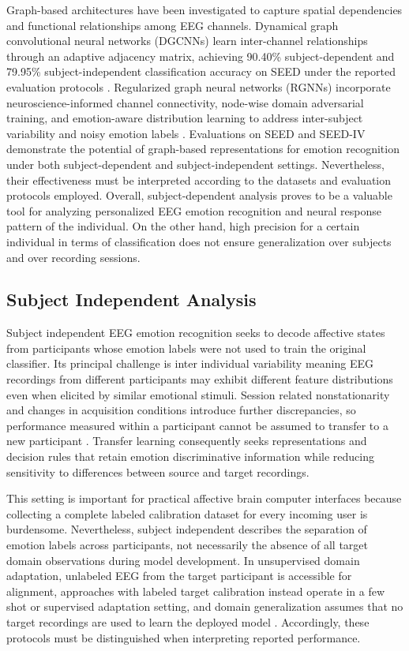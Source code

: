 \documentclass[ASNA,twocolumn]{USG}
\begin{document}
Graph-based architectures have been investigated to capture spatial dependencies and functional relationships among EEG channels. Dynamical graph convolutional neural networks (DGCNNs) learn inter-channel relationships through an adaptive adjacency matrix, achieving 90.40\% subject-dependent and 79.95\% subject-independent classification accuracy on SEED under the reported evaluation protocols \cite{song2018eeg}. Regularized graph neural networks (RGNNs) incorporate neuroscience-informed channel connectivity, node-wise domain adversarial training, and emotion-aware distribution learning to address inter-subject variability and noisy emotion labels \cite{zhong2020eeg}. Evaluations on SEED and SEED-IV demonstrate the potential of graph-based representations for emotion recognition under both subject-dependent and subject-independent settings. Nevertheless, their effectiveness must be interpreted according to the datasets and evaluation protocols employed. Overall, subject-dependent analysis proves to be a valuable tool for analyzing personalized EEG emotion recognition and neural response pattern of the individual. On the other hand, high precision for a certain individual in terms of classification does not ensure generalization over subjects and over recording sessions.


\subsection{Subject Independent Analysis}
\label{sec:subject_independent_analysis}

Subject independent EEG emotion recognition seeks to decode affective states from participants whose emotion labels were not used to train the original classifier. Its principal challenge is inter individual variability meaning EEG recordings from different participants may exhibit different feature distributions even when elicited by similar emotional stimuli. Session related nonstationarity and changes in acquisition conditions introduce further discrepancies, so performance measured within a participant cannot be assumed to transfer to a new participant \cite{li2018cross,wu2020transfer}. Transfer learning consequently seeks representations and decision rules that retain emotion discriminative information while reducing sensitivity to differences between source and target recordings.

This setting is important for practical affective brain computer interfaces because collecting a complete labeled calibration dataset for every incoming user is burdensome. Nevertheless, subject independent describes the separation of emotion labels across participants, not necessarily the absence of all target domain observations during model development. In unsupervised domain adaptation, unlabeled EEG from the target participant is accessible for alignment, approaches with labeled target calibration instead operate in a few shot or supervised adaptation setting, and domain generalization assumes that no target recordings are used to learn the deployed model \cite{zhao2021plug,zhou2022domain}. Accordingly, these protocols must be distinguished when interpreting reported performance.
\end{document}
